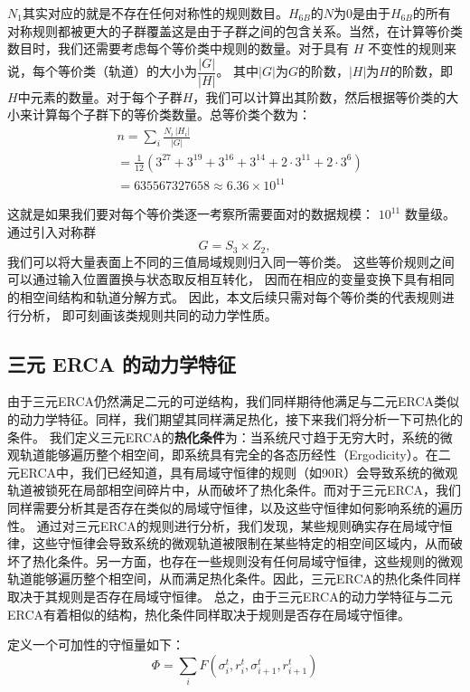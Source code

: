 \documentclass[reprint, amsmath, amssymb, aps, physrev,prb]{revtex4-2}
\begin{document}
$N_1$其实对应的就是不存在任何对称性的规则数目。$H_{6B}$的$N$为$0$是由于$H_{6B}$的所有对称规则都被更大的子群覆盖这是由于子群之间的包含关系。当然，在计算等价类数目时，我们还需要考虑每个等价类中规则的数量。对于具有 $H$ 不变性的规则来说，每个等价类（轨道）的大小为$\dfrac{|G|}{|H|}$。
其中$|G|$为$G$的阶数，$|H|$为$H$的阶数，即$H$中元素的数量。对于每个子群$H$，我们可以计算出其阶数，然后根据等价类的大小来计算每个子群下的等价类数量。总等价类个数为：
\begin{equation}
    \begin{aligned}
    &n = \sum_i \frac{N_i\,|H_i|}{|G|} \\
    & = \frac{1}{12}(3^{27} + 3^{19} + 3^{16} + 3^{14} +2 \cdot 3^{11} + 2 \cdot 3^{6})\\
    & = 635567327658 \approx 6.36 \times 10^{11}
    \end{aligned}
\end{equation}


这就是如果我们要对每个等价类逐一考察所需要面对的数据规模：
$10^{11}$ 数量级。通过引入对称群
\[
    G=S_3\times Z_2,
\]
我们可以将大量表面上不同的三值局域规则归入同一等价类。
这些等价规则之间可以通过输入位置置换与状态取反相互转化，
因而在相应的变量变换下具有相同的相空间结构和轨道分解方式。
因此，本文后续只需对每个等价类的代表规则进行分析，
即可刻画该类规则共同的动力学性质。



\subsection{三元 ERCA 的动力学特征}
由于三元ERCA仍然满足二元的可逆结构，我们同样期待他满足与二元ERCA类似的动力学特征。同样，我们期望其同样满足热化，接下来我们将分析一下可热化的条件。
我们定义三元ERCA的\textbf{热化条件}为：当系统尺寸趋于无穷大时，系统的微观轨道能够遍历整个相空间，即系统具有完全的各态历经性（Ergodicity）。在二元ERCA中，我们已经知道，具有局域守恒律的规则（如90R）会导致系统的微观轨道被锁死在局部相空间碎片中，从而破坏了热化条件。而对于三元ERCA，我们同样需要分析其是否存在类似的局域守恒律，以及这些守恒律如何影响系统的遍历性。
通过对三元ERCA的规则进行分析，我们发现，某些规则确实存在局域守恒律，这些守恒律会导致系统的微观轨道被限制在某些特定的相空间区域内，从而破坏了热化条件。另一方面，也存在一些规则没有任何局域守恒律，这些规则的微观轨道能够遍历整个相空间，从而满足热化条件。因此，三元ERCA的热化条件同样取决于其规则是否存在局域守恒律。
总之，由于三元ERCA的动力学特征与二元ERCA有着相似的结构，热化条件同样取决于规则是否存在局域守恒律。

定义一个可加性的守恒量如下：
\begin{equation}
    \Phi = \sum_i F(\sigma_i^t , r_i^t , \sigma_{i+1}^t , r_{i+1}^t)
\end{equation}
\end{document}
